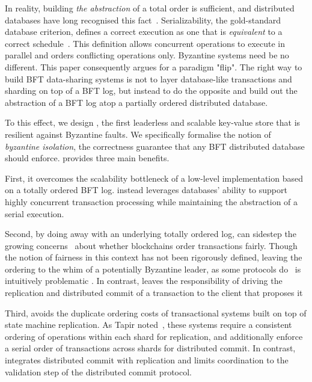 In reality, building \textit{the abstraction} of a total order is sufficient, and distributed databases have long recognised this fact~\cite{crooks2018obladi,bernstein1979fas,Papadimitriou1979serializability,adya99weakconsis}. Serializability, the gold-standard database criterion, defines a correct execution as one that is \textit{equivalent} to a correct schedule~\cite{bernstein1979fas,Papadimitriou1979serializability,bernstein1979fas}. This definition allows concurrent operations to execute in parallel and orders conflicting operations only.  Byzantine systems need be no different. This paper consequently argues for a paradigm "flip". The
right way to build BFT data-sharing systems is not to layer database-like transactions and sharding on top of a BFT log, but instead to do the opposite and build out the abstraction of a BFT log atop a partially ordered distributed database.

To this effect, we design \sys{}, the first leaderless and scalable key-value store that is resilient against
Byzantine faults. We specifically formalise the notion of \textit{byzantine isolation}, the correctness
guarantee that any BFT distributed database should enforce.  \sys{} provides three main benefits.

 First, it overcomes the scalability bottleneck of a low-level
implementation based on a totally ordered BFT log. \sys instead leverages databases' ability to support highly concurrent transaction
processing while maintaining the abstraction
of a serial execution.


Second, by doing away with an underlying totally ordered log, \sys{} can
sidestep the growing concerns~\cite{} about whether blockchains
order transactions fairly. Though the notion of fairness in this
context has not been rigorously defined, leaving the ordering to the
whim of a potentially Byzantine leader, as some protocols do~\cite{
Kotla07Zyzzyva,castro1999practical}
is intuitively problematic \cite{herlihy2016enhancing}. In contrast, \sys leaves the
responsibility of driving the replication and distributed commit of a
transaction to the client that proposes it   

Third, \sys{} avoids the duplicate ordering costs of transactional systems
built on top of state machine replication. As Tapir noted~\cite{zhang2015tapir,mu2016consolidating},
these systems require a consistent ordering of
operations within each shard for replication, and additionally enforce a serial order of transactions across
shards for distributed commit. In contrast, \sys{} integrates distributed commit with 
replication and
limits coordination to the validation step of the distributed commit
protocol.

